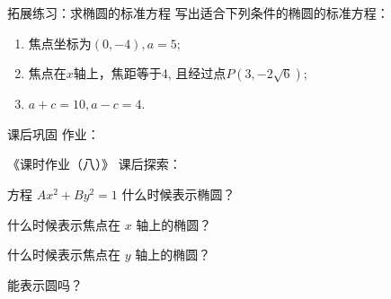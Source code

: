 \documentclass{beamer}
\begin{document}
    \begin{frame}{\qquad 拓展练习：求椭圆的标准方程}
      写出适合下列条件的椭圆的标准方程：

      \begin{enumerate}
        \item 焦点坐标为$(0,-4), a=5$; \pause \vspace{20pt}
        \item 焦点在$x$轴上，焦距等于4, 且经过点$P(3,-2 \sqrt{6})$; \pause \vspace{20pt}
        \item $a+c=10, a-c=4$.
      \end{enumerate}
    \end{frame}

    \begin{frame}{\qquad 课后巩固}
      作业：

      《课时作业（八）》
      \vfill
      课后探索：
      \vspace{10pt}

      方程 $Ax^2 + By^2 =1$ 什么时候表示椭圆？

      什么时候表示焦点在 $x$ 轴上的椭圆？

      什么时候表示焦点在 $y$ 轴上的椭圆？

      能表示圆吗？

    \end{frame}
\end{document}
